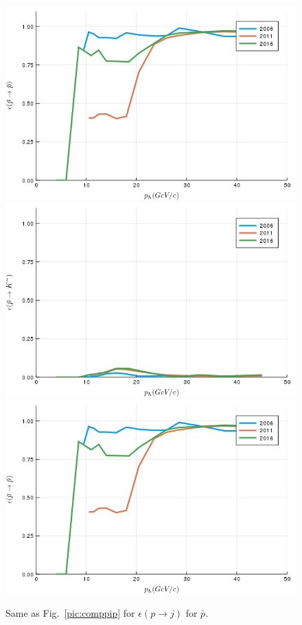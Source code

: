 \begin{figure}[!h]
  \centering
	\includegraphics[scale=0.35]{./gfx/t1/pm2pm.png}
  \includegraphics[scale=0.35]{./gfx/t1/pm2km.png}
  \includegraphics[scale=0.35]{./gfx/t1/pm2pm.png}
	\caption{Same as Fig.~\ref{pic:comppip} for $\epsilon(p \rightarrow j)$ for $\bar{p}$.}
	\label{pic:comppm}
\end{figure}

